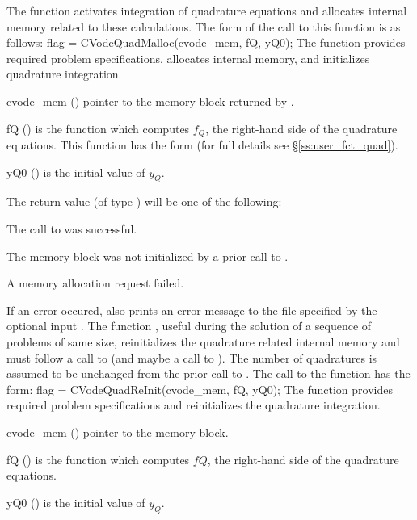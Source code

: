 The function  activates integration of quadrature equations 
and allocates internal memory related to these calculations.
The form of the call to this function is as follows:
{
flag = CVodeQuadMalloc(cvode\_mem, fQ, yQ0);
}
{
  The function  provides required problem specifications,
  allocates internal memory, and initializes quadrature integration.
}
{
  \begin{args}
  \item[cvode\_mem] ()
    pointer to the {\cvodes} memory block returned by .
  \item[fQ] ()
    is the {\C} function which computes $f_Q$, the right-hand side of the quadrature
    equations. This function has the form 
     (for full details see \S\ref{ss:user_fct_quad}).
  \item[yQ0] ()
    is the initial value of $y_Q$.
  \end{args}
}
{
  The return value  (of type ) will be one of the following:
  \begin{args}
  \item[\Id{CV\_SUCCESS}]
    The call to  was successful.
  \item[\Id{CV\_MEM\_NULL}] 
    The {\cvodes} memory block was not initialized by a prior call to .
  \item[\Id{CV\_MEM\_FAIL}] 
    A memory allocation request failed.
  \end{args}
}
{
  If an error occured,  also prints an error message to the
  file specified by the optional input .
}
The function , useful during the solution of a sequence of problems of 
same size, reinitializes the quadrature related internal memory 
and must follow a call to  (and maybe a call to ). 
The number  of quadratures is assumed to be unchanged from the prior call to 
.
The call to the  function has the form:
{
  flag = CVodeQuadReInit(cvode\_mem, fQ, yQ0);
}
{
  The function  provides required problem specifications 
  and reinitializes the quadrature integration.
}
{
  \begin{args}
  \item[cvode\_mem] ()
    pointer to the {\cvodes} memory block.
  \item[fQ] ()
    is the {\C} function which computes $fQ$, the right-hand side of the quadrature
    equations.
  \item[yQ0] ()
    is the initial value of $y_Q$.
  \end{args}
}
